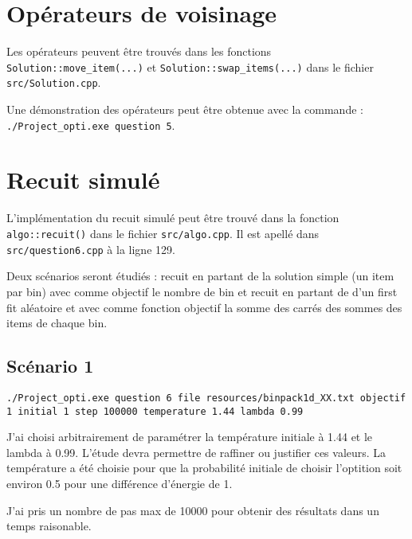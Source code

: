 \documentclass[10pt,a4paper]{article}
\begin{document}
\section{Opérateurs de voisinage}

Les opérateurs peuvent être trouvés dans les fonctions \texttt{Solution::move\_item(...)} et \texttt{Solution::swap\_items(...)} dans le fichier \texttt{src/Solution.cpp}.

Une démonstration des opérateurs peut être obtenue avec la commande : \texttt{./Project\_opti.exe question 5}.

\section{Recuit simulé}

L'implémentation du recuit simulé peut être trouvé dans la fonction \texttt{algo::recuit()} dans le fichier \texttt{src/algo.cpp}.
Il est apellé dans \texttt{src/question6.cpp} à la ligne 129.

Deux scénarios seront étudiés : recuit en partant de la solution simple (un item par bin) avec comme objectif le nombre de bin et recuit en partant de d'un first fit aléatoire et avec comme fonction objectif la somme des carrés des sommes des items de chaque bin.
\pagebreak
\subsection{Scénario 1}

\texttt{./Project\_opti.exe question 6 file resources/binpack1d\_XX.txt objectif 1 initial 1 step 100000 temperature 1.44 lambda 0.99}

J'ai choisi arbitrairement de paramétrer la température initiale à 1.44 et le lambda à 0.99. L'étude devra permettre de raffiner ou justifier ces valeurs.
La température a été choisie pour que la probabilité initiale de choisir l'optition soit environ 0.5 pour une différence d'énergie de 1.

J'ai pris un nombre de pas max de 10000 pour obtenir des résultats dans un temps raisonable.
\end{document}
